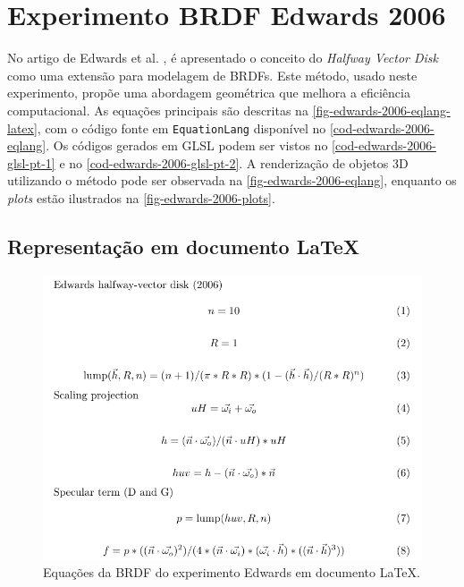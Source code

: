 
\section{Experimento BRDF Edwards 2006}
\label{section-experiment-edwards-2006}

No artigo de Edwards et al. \cite{edwards2006halfway}, é apresentado o conceito do \textit{Halfway Vector Disk} como uma extensão para modelagem de BRDFs. Este método, usado neste experimento, propõe uma abordagem geométrica que melhora a eficiência computacional. As equações principais são descritas na \autoref{fig-edwards-2006-eqlang-latex}, com o código fonte em \texttt{EquationLang} disponível no \autoref{cod-edwards-2006-eqlang}. Os códigos gerados em GLSL podem ser vistos no \autoref{cod-edwards-2006-glsl-pt-1} e no \autoref{cod-edwards-2006-glsl-pt-2}. A renderização de objetos 3D utilizando o método pode ser observada na \autoref{fig-edwards-2006-eqlang}, enquanto os \textit{plots} estão ilustrados na \autoref{fig-edwards-2006-plots}.

\subsection{Representação em documento \LaTeX{}}
\begin{figure}[H]
    \caption{\label{fig-edwards-2006-eqlang-latex} \small Equações da BRDF do experimento Edwards em documento \LaTeX{}.}
    \begin{center}
        \includegraphics[scale=0.92]{./Imagens/brdfs/edwards-2006.pdf}
    \end{center}
\end{figure}

